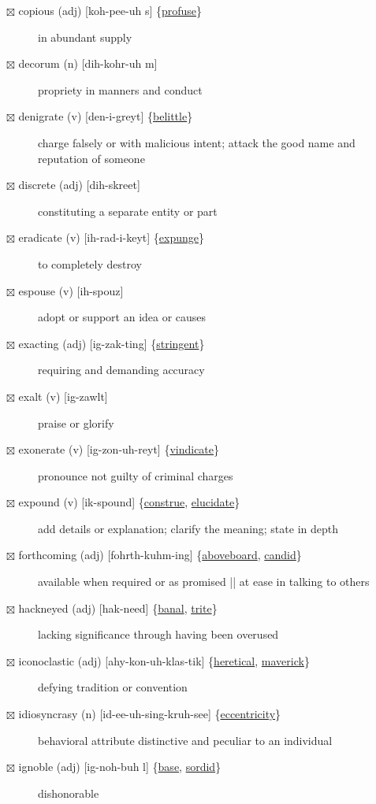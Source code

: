 \documentclass[11pt]{article}
\begin{document}
\begin{description}
\item[{$\boxtimes$ \label{org45be7d0}copious (adj) [koh-pee-uh s] \{\hyperref[orgfca233d]{profuse}\}}] in abundant supply
\item[{$\boxtimes$ decorum (n) [dih-kohr-uh m]}] propriety in manners and conduct
\item[{$\boxtimes$ \label{org1dde5c1}denigrate (v) [den-i-greyt] \{\hyperref[orgc120ceb]{belittle}\}}] charge falsely or with malicious intent; attack the good name and reputation of someone
\item[{$\boxtimes$ discrete (adj) [dih-skreet]}] constituting a separate entity or part
\item[{$\boxtimes$ \label{orga12b9b2}eradicate (v) [ih-rad-i-keyt] \{\hyperref[org89a90ea]{expunge}\}}] to completely destroy
\item[{$\boxtimes$ espouse (v) [ih-spouz]}] adopt or support an idea or causes
\item[{$\boxtimes$ \label{org7c24807}exacting (adj) [ig-zak-ting] \{\hyperref[orgab990a0]{stringent}\}}] requiring and demanding accuracy
\item[{$\boxtimes$ exalt (v) [ig-zawlt]}] praise or glorify
\item[{$\boxtimes$ \label{org51dafe7}exonerate (v) [ig-zon-uh-reyt] \{\hyperref[org7808c98]{vindicate}\}}] pronounce not guilty of criminal charges
\item[{$\boxtimes$ \label{org6079d2d}expound (v) [ik-spound] \{\hyperref[orgb0dc1b1]{construe}, \hyperref[orgedb44cd]{elucidate}\}}] add details or explanation; clarify the meaning; state in depth
\item[{$\boxtimes$ \label{org2cb80f0}forthcoming (adj) [fohrth-kuhm-ing] \{\hyperref[org5b88c40]{aboveboard}, \hyperref[org28fa9d1]{candid}\}}] available when required or as promised || at ease in talking to others
\item[{$\boxtimes$ \label{org3731f44}hackneyed (adj) [hak-need] \{\hyperref[orgf0ea999]{banal}, \hyperref[org91e02d4]{trite}\}}] lacking significance through having been overused
\item[{$\boxtimes$ \label{org5ce254f}iconoclastic (adj) [ahy-kon-uh-klas-tik] \{\hyperref[orgac2067d]{heretical}, \hyperref[org15e752e]{maverick}\}}] defying tradition or convention
\item[{$\boxtimes$ idiosyncrasy (n) [id-ee-uh-sing-kruh-see] \{\hyperref[orga4742b8]{eccentricity}\}}] behavioral attribute distinctive and peculiar to an individual
\item[{$\boxtimes$ \label{orgda18690}ignoble (adj) [ig-noh-buh l] \{\hyperref[org3f59f0a]{base}, \hyperref[org6a88c2e]{sordid}\}}] dishonorable

\end{description}
\end{document}
